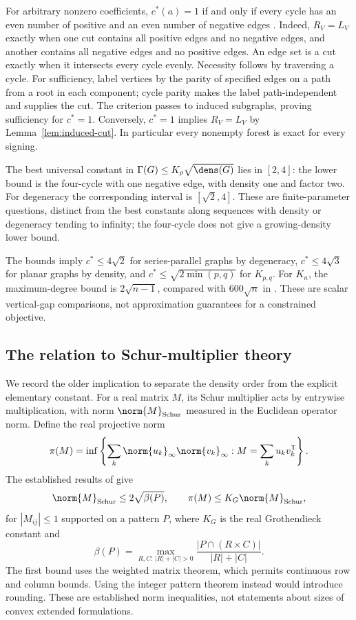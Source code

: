 For arbitrary nonzero coefficients, $c^*(a)=1$ if and only if every cycle
has an even number of positive and an even number of negative edges
\citep[Theorem 4]{Boland2017}. Indeed, $R_V=L_V$ exactly when one cut
contains all positive edges and no negative edges, and another contains
all negative edges and no positive edges. An edge set is a cut exactly
when it intersects every cycle evenly. Necessity follows by traversing a
cycle. For sufficiency, label vertices by the parity of specified edges
on a path from a root in each component; cycle parity makes the label
path-independent and supplies the cut. The criterion passes to induced
subgraphs, proving sufficiency for $c^*=1$. Conversely, $c^*=1$ implies
$R_V=L_V$ by Lemma~\ref{lem:induced-cut}. In particular every nonempty
forest is exact for every signing.

The best universal constant in $\Gamma(G)\le K_\rho\sqrt{\dens(G)}$
lies in $[2,4]$: the lower bound is the four-cycle with one negative edge,
with density one and factor two. For degeneracy the corresponding interval
is $[\sqrt2,4]$. These are finite-parameter questions, distinct from the
best constants along sequences with density or degeneracy tending to
infinity; the four-cycle does not give a growing-density lower bound.

The bounds imply $c^*\le4\sqrt2$ for series-parallel graphs by degeneracy,
$c^*\le4\sqrt3$ for planar graphs by density, and
$c^*\le\sqrt{2\min(p,q)}$ for $K_{p,q}$. For $K_n$, the maximum-degree
bound is $2\sqrt{n-1}$, compared with $600\sqrt n$ in
\citet[Theorem 2]{Boland2017}. These are scalar vertical-gap comparisons,
not approximation guarantees for a constrained objective.

\subsection{The relation to Schur-multiplier theory}\label{subsec:schur}
We record the older implication to separate the density order from the
explicit elementary constant. For a real matrix $M$, its Schur multiplier
acts by entrywise multiplication, with norm $\norm{M}_{\mathrm{Schur}}$
measured in the Euclidean operator norm. Define the real projective norm
\[
 \pi(M)=\inf\left\{\sum_k\norm{u_k}_\infty\norm{v_k}_\infty:
                         M=\sum_k u_kv_k^{\mathsf T}\right\}.
\]
The established results of
\citet[Theorems 1.2 and 2.4]{DavidsonDonsig2007} give
\begin{equation}\label{eq:schur-input}
 \norm{M}_{\mathrm{Schur}}\le2\sqrt{\beta(P)},\qquad
 \pi(M)\le K_G\norm{M}_{\mathrm{Schur}},
\end{equation}
for $|M_{ij}|\le1$ supported on a pattern $P$, where $K_G$ is the real
Grothendieck constant and
\[
 \beta(P)=\max_{R,C:\,|R|+|C|>0}
             \frac{|P\cap(R\times C)|}{|R|+|C|}.
\]
The first bound uses the weighted matrix theorem, which permits continuous
row and column bounds. Using the integer pattern theorem instead would
introduce rounding. These are established norm inequalities, not statements
about sizes of convex extended formulations.

